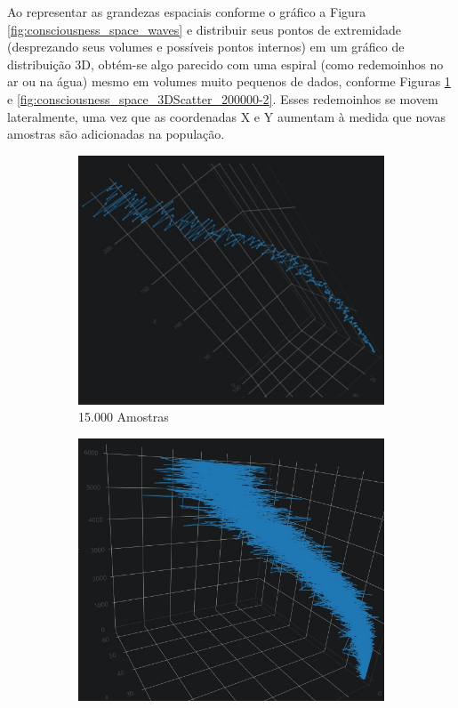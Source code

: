 Ao representar as grandezas espaciais conforme o gráfico a Figura \ref{fig:consciousness_space_waves} e distribuir seus pontos de extremidade (desprezando seus volumes e possíveis pontos internos) em um gráfico de distribuição 3D, obtém-se algo parecido com uma espiral (como redemoinhos no ar ou na água) mesmo em volumes muito pequenos de dados, conforme Figuras \ref{fig:consciousness_space_3DScatter15000-10} e \ref{fig:consciousness_space_3DScatter_200000-2}. Esses redemoinhos se movem lateralmente, uma vez que as coordenadas X e Y aumentam à medida que novas amostras são adicionadas na população. 
\begin{figure}[H]
\centering
	\begin{subfigure}[H]{0.47\linewidth}
	\centering
	\includegraphics[width=.96\linewidth]{sections/images/consciousness_space_3DScatter15000-10.jpg}
	\caption{15.000 Amostras}
	\label{fig:consciousness_space_3DScatter15000-10}
	\end{subfigure}
\hfill
	\begin{subfigure}[H]{0.47\linewidth}
	\centering
	\includegraphics[width=.9\linewidth]{sections/images/consciousness_space_3DScatter_200000-2.jpg}

\end{subfigure}
\end{figure}
